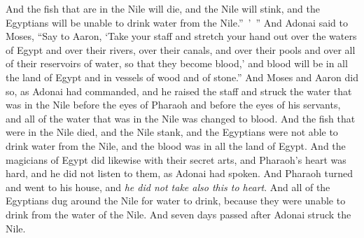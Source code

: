 \begin{biblechapter}
\verse And the fish that are in the Nile will die, and the Nile will stink, and the Egyptians will be unable to drink water from the Nile.” ’ ”
\verse And Adonai said to Moses, “Say to Aaron, ‘Take your staff and stretch your hand out over the waters of Egypt and over their rivers, over their canals, and over their pools and over all of their reservoirs of water, so that they become blood,’ and blood will be in all the land of Egypt and in vessels of wood and of stone.”
\verse And Moses and Aaron did so, as Adonai had commanded, and he raised the staff and struck the water that was in the Nile before the eyes of Pharaoh and before the eyes of his servants, and all of the water that was in the Nile was changed to blood.
\verse And the fish that were in the Nile died, and the Nile stank, and the Egyptians were not able to drink water from the Nile, and the blood was in all the land of Egypt.
\verse And the magicians of Egypt did likewise with their secret arts, and Pharaoh’s heart was hard, and he did not listen to them, as Adonai had spoken.
\verse And Pharaoh turned and went to his house, and \textit{he did not take also this to heart}.
\verse And all of the Egyptians dug around the Nile for water to drink, because they were unable to drink from the water of the Nile.
\verse And seven days passed after Adonai struck the Nile.
\end{biblechapter}

